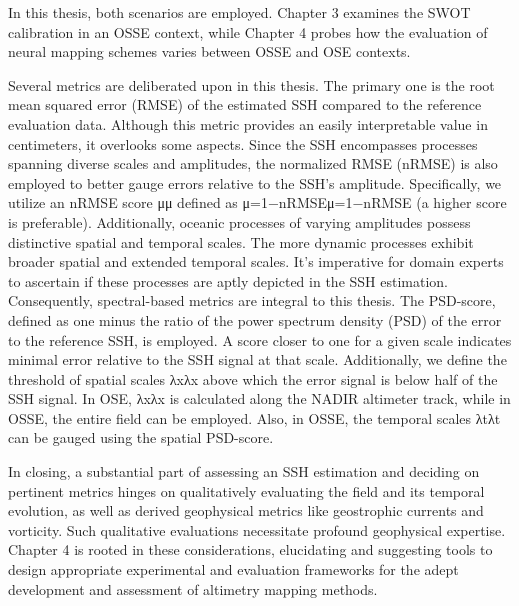\begin{bibunit}
In this thesis, both scenarios are employed. Chapter 3 examines the SWOT calibration in an OSSE context, while Chapter 4 probes how the evaluation of neural mapping schemes varies between OSSE and OSE contexts.

Several metrics are deliberated upon in this thesis. The primary one is the root mean squared error (RMSE) of the estimated SSH compared to the reference evaluation data. Although this metric provides an easily interpretable value in centimeters, it overlooks some aspects. Since the SSH encompasses processes spanning diverse scales and amplitudes, the normalized RMSE (nRMSE) is also employed to better gauge errors relative to the SSH's amplitude. Specifically, we utilize an nRMSE score μμ defined as μ=1−nRMSEμ=1−nRMSE (a higher score is preferable). Additionally, oceanic processes of varying amplitudes possess distinctive spatial and temporal scales. The more dynamic processes exhibit broader spatial and extended temporal scales. It's imperative for domain experts to ascertain if these processes are aptly depicted in the SSH estimation. Consequently, spectral-based metrics are integral to this thesis. The PSD-score, defined as one minus the ratio of the power spectrum density (PSD) of the error to the reference SSH, is employed. A score closer to one for a given scale indicates minimal error relative to the SSH signal at that scale. Additionally, we define the threshold of spatial scales λxλx​ above which the error signal is below half of the SSH signal. In OSE, λxλx​ is calculated along the NADIR altimeter track, while in OSSE, the entire field can be employed. Also, in OSSE, the temporal scales λtλt​ can be gauged using the spatial PSD-score.

In closing, a substantial part of assessing an SSH estimation and deciding on pertinent metrics hinges on qualitatively evaluating the field and its temporal evolution, as well as derived geophysical metrics like geostrophic currents and vorticity. Such qualitative evaluations necessitate profound geophysical expertise. Chapter 4 is rooted in these considerations, elucidating and suggesting tools to design appropriate experimental and evaluation frameworks for the adept development and assessment of altimetry mapping methods.




\end{bibunit}
